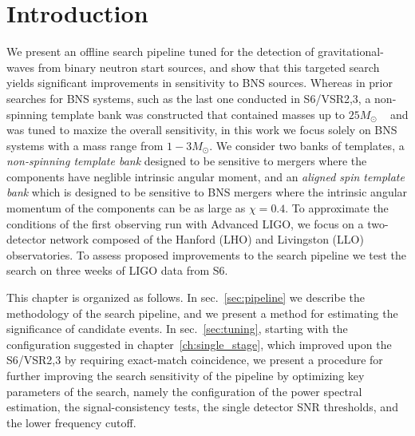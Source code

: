 


\section{Introduction}
\label{sec:introduction}

We present an offline search pipeline tuned for the detection of gravitational-waves from binary neutron start sources, and show that this targeted search yields significant improvements in sensitivity to BNS sources. Whereas in prior searches for BNS systems, such as the last one conducted in S6/VSR2,3, a non-spinning template bank was constructed that contained masses up to $25M_\odot$ ~\cite{Abadie:2011nz} and was tuned to maxize the overall sensitivity, in this work we focus solely on BNS systems with a mass range from $1-3 M_\odot$. We consider two banks of templates, a \emph{non-spinning template bank} designed to be sensitive to mergers where the components have neglible intrinsic angular moment, and an \emph{aligned spin template bank} which is designed to be sensitive to BNS mergers where the intrinsic angular momentum of the components can be as large as $\chi=0.4$. To approximate the conditions of the first observing run with Advanced LIGO, we focus on a two-detector network composed of the Hanford (LHO) and Livingston (LLO) observatories. To assess proposed improvements to the search pipeline we test the search on three weeks of LIGO data from S6.

This chapter is organized as follows. In sec.~\ref{sec:pipeline} we describe the methodology of the search pipeline, and we present a method for estimating the significance of candidate events. In sec.~\ref{sec:tuning}, starting with the configuration suggested in chapter~\ref{ch:single_stage}, which improved upon the S6/VSR2,3 by requiring exact-match coincidence, we present a procedure for further improving the search sensitivity of the pipeline by optimizing key parameters of the search, namely the configuration of the power spectral estimation, the signal-consistency tests, the single detector SNR thresholds, and the lower frequency cutoff. 

